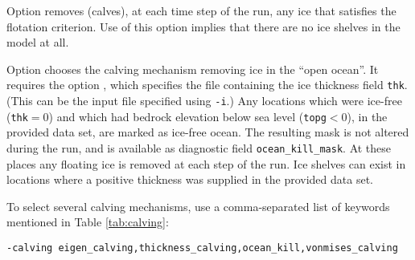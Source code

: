 Option  removes (calves), at each time step of the run, any ice that satisfies the flotation criterion.  Use of this option implies that there are no ice shelves in the model at all.

Option  chooses the calving mechanism removing ice in the ``open ocean''. It requires the option , which specifies the file containing the ice thickness field \texttt{thk}. (This can be the input file specified using \texttt{-i}.) Any locations which were ice-free (\texttt{thk}$=0$) and which had bedrock elevation below sea level (\texttt{topg}$<0$), in the provided data set, are marked as ice-free ocean.  The resulting mask is not altered during the run, and is available as diagnostic field \texttt{ocean_kill_mask}.  At these places any floating ice is removed at each step of the run.  Ice shelves can exist in locations where a positive thickness was supplied in the provided data set.

To select several calving mechanisms, use a comma-separated list of keywords mentioned in Table \ref{tab:calving}:
\begin{verbatim}
-calving eigen_calving,thickness_calving,ocean_kill,vonmises_calving
\end{verbatim}

